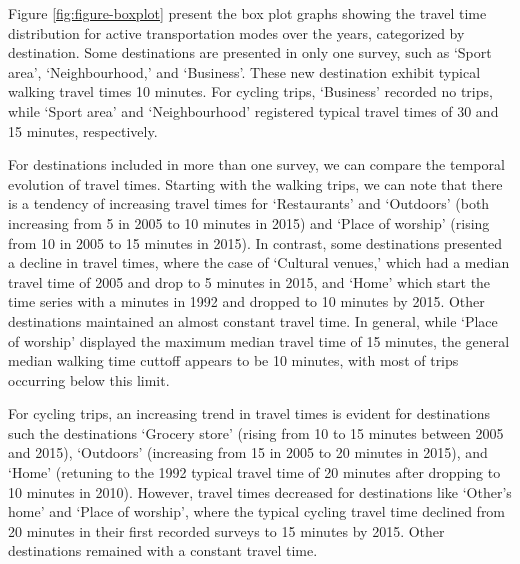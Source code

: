 \documentclass[preprint, 3p,
authoryear]{elsarticle} %
\begin{document}
Figure \ref{fig:figure-boxplot} present the box plot graphs showing the
travel time distribution for active transportation modes over the years,
categorized by destination. Some destinations are presented in only one
survey, such as `Sport area', `Neighbourhood,' and `Business'. These new
destination exhibit typical walking travel times 10 minutes. For cycling
trips, `Business' recorded no trips, while `Sport area' and
`Neighbourhood' registered typical travel times of 30 and 15 minutes,
respectively.

For destinations included in more than one survey, we can compare the
temporal evolution of travel times. Starting with the walking trips, we
can note that there is a tendency of increasing travel times for
`Restaurants' and `Outdoors' (both increasing from 5 in 2005 to 10
minutes in 2015) and `Place of worship' (rising from 10 in 2005 to 15
minutes in 2015). In contrast, some destinations presented a decline in
travel times, where the case of `Cultural venues,' which had a median
travel time of 2005 and drop to 5 minutes in 2015, and `Home' which
start the time series with a minutes in 1992 and dropped to 10 minutes
by 2015. Other destinations maintained an almost constant travel time.
In general, while `Place of worship' displayed the maximum median travel
time of 15 minutes, the general median walking time cuttoff appears to
be 10 minutes, with most of trips occurring below this limit.

For cycling trips, an increasing trend in travel times is evident for
destinations such the destinations `Grocery store' (rising from 10 to 15
minutes between 2005 and 2015), `Outdoors' (increasing from 15 in 2005
to 20 minutes in 2015), and `Home' (retuning to the 1992 typical travel
time of 20 minutes after dropping to 10 minutes in 2010). However,
travel times decreased for destinations like `Other's home' and `Place
of worship', where the typical cycling travel time declined from 20
minutes in their first recorded surveys to 15 minutes by 2015. Other
destinations remained with a constant travel time.
\end{document}
